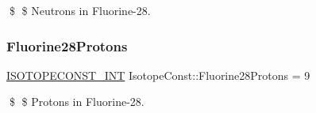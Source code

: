 \$ \$ Neutrons in Fluorine-\/28. \mbox{\label{group___isotope_const-_fluorine-_f28_ga0e1fa173104f21df002ce9f46271b2a1}} 
\subsubsection{\texorpdfstring{Fluorine28\+Protons}{Fluorine28Protons}}
{\footnotesize\ttfamily \mbox{\hyperlink{group___isotope_const-_macros_ga5f18360b3e99483a35c32d789e62621c}{I\+S\+O\+T\+O\+P\+E\+C\+O\+N\+S\+T\+\_\+\+I\+NT}} Isotope\+Const\+::\+Fluorine28\+Protons = 9}

\$ \$ Protons in Fluorine-\/28. 